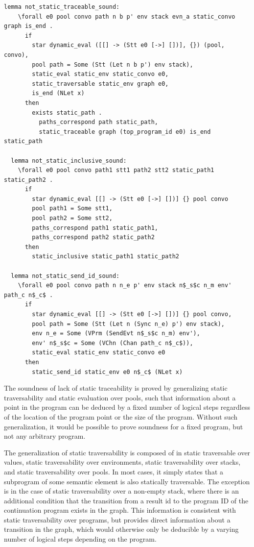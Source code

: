 \documentclass{article}
\begin{document}
\begin{lstlisting}[language=logic, mathescape]
  lemma not_static_traceable_sound:
    \forall e0 pool convo path n b p' env stack evn_a static_convo graph is_end .
      if
        star dynamic_eval ([[] -> (Stt e0 [->] [])], {}) (pool, convo), 
        pool path = Some (Stt (Let n b p') env stack),
        static_eval static_env static_convo e0,
        static_traversable static_env graph e0,
        is_end (NLet x)
      then
        exists static_path . 
          paths_correspond path static_path, 
          static_traceable graph (top_program_id e0) is_end static_path

  lemma not_static_inclusive_sound:
    \forall e0 pool convo path1 stt1 path2 stt2 static_path1 static_path2 . 
      if
        star dynamic_eval [[] -> (Stt e0 [->] [])] {} pool convo
        pool path1 = Some stt1, 
        pool path2 = Some stt2, 
        paths_correspond path1 static_path1, 
        paths_correspond path2 static_path2
      then
        static_inclusive static_path1 static_path2

  lemma not_static_send_id_sound:
    \forall e0 pool convo path n n_e p' env stack n$_s$c n_m env' path_c n$_c$ .
      if
        star dynamic_eval [[] -> (Stt e0 [->] [])] {} pool convo, 
        pool path = Some (Stt (Let n (Sync n_e) p') env stack), 
        env n_e = Some (VPrm (SendEvt n$_s$c n_m) env'), 
        env' n$_s$c = Some (VChn (Chan path_c n$_c$)), 
        static_eval static_env static_convo e0
      then 
        static_send_id static_env e0 n$_c$ (NLet x)
\end{lstlisting}

The soundness of lack of static traceability is proved by generalizing
static traversability and static evaluation over pools, such that information about a point in
the program can be deduced by a fixed number of logical steps regardless of the location of the
program point or the size of the program. Without such generalization, it would be possible to
prove soundness for a fixed program, but not any arbitrary program.

The generalization of static traversability is composed of in static traversable over values,
static traversability over environments, static traversability over stacks, and static
traversability over pools.
In most cases, it simply states that a subprogram of some semantic element is also statically
traversable. The exception is in the case of
static traversability over a non-empty stack, where
there is an additional condition that the transition
from a result id to the program ID
of the continuation program exists in the graph.
This information is consistent with static
traversability over programs, but provides direct information about a transition in the
graph, which would otherwise only be deducible by a varying number of logical steps
depending on the program.
\end{document}
